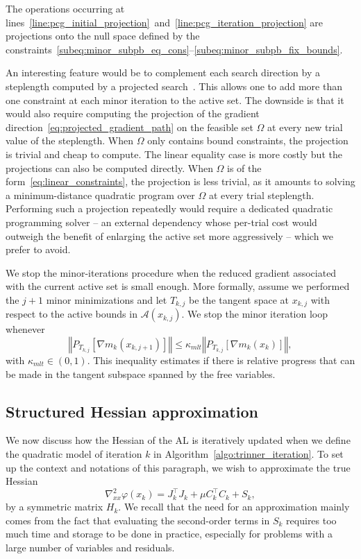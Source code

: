 \documentclass{article}
\numberwithin{equation}{section}
\newcommand{\calA}{{\mathcal{A}}}
\newcommand{\proj}[2]{P_{#1} \left[ {#2} \right]} %
\theoremstyle{plain}
\begin{document}
	The operations occurring at lines~\ref{line:pcg_initial_projection}~and~\ref{line:pcg_iteration_projection} are projections onto the null space defined by the constraints~\eqref{subeq:minor_subpb_eq_cons}--\eqref{subeq:minor_subpb_fix_bounds}.
	
	An interesting feature would be to complement each search direction by a steplength computed by a projected search~\cite{moretoraldo:1991,linmore:1999a}. This allows one to add more than one constraint at each minor iteration to the active set. The downside is that it would also require computing the projection of the gradient direction~\eqref{eq:projected_gradient_path} on the feasible set $\Omega$ at every new trial value of the steplength. When $\Omega$ only contains bound constraints, the projection is trivial and cheap to compute. The linear equality case is more costly but the projections can also be computed directly. When $\Omega$ is of the form~\eqref{eq:linear_constraints}, the projection is less trivial, as it amounts to solving a minimum-distance quadratic program over $\Omega$ at every trial steplength. Performing such a projection repeatedly would require a dedicated quadratic programming solver -- an external dependency whose per-trial cost would outweigh the benefit of enlarging the active set more aggressively -- which we prefer to avoid.
	
	We stop the minor-iterations procedure when the reduced gradient associated with the current active set is small enough. More formally, assume we performed the $j+1$ minor minimizations and let $T_{k,j}$ be the tangent space at $x_{k,j}$ with respect to the active bounds in $\calA(x_{k,j})$. We stop the minor iteration loop whenever
	\begin{equation*}
		\left\Vert \proj{T_{k,j}}{\nabla m_k(x_{k,j+1})} \right\Vert \le \kappa_{mlt} \left\Vert \proj{T_{k,j}}{\nabla m_k(x_k)}\right\Vert,
	\end{equation*}
	with $\kappa_{mlt} \in (0,1)$. This inequality estimates if there is relative progress that can be made in the tangent subspace spanned by the free variables. 
	
	\subsection{Structured Hessian approximation}\label{subsec:hessian_approx}
	
	We now discuss how the Hessian of the AL is iteratively updated when we define the quadratic model of iteration $k$ in Algorithm~\ref{algo:trinner_iteration}. To set up the context and notations of this paragraph, we wish to approximate the true Hessian
	\[\nabla_{xx}^2 \varphi(x_k) = J_k^\top J_k + \mu C_k^\top C_k + S_k,\]  
	by a symmetric matrix $H_k$.
	We recall that the need for an approximation mainly comes from the fact that evaluating the second-order terms in $S_k$ requires too much time and storage to be done in practice, especially for problems with a large number of variables and residuals.
	
\end{document}
